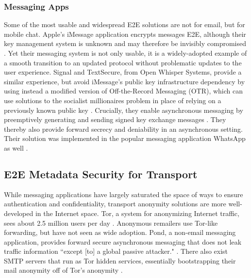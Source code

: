 \documentclass[pageno]{jpaper}
\begin{document}
\subsubsection{Messaging Apps}
Some of the most usable and widespread E2E solutions are not for email, but for mobile chat. Apple's iMessage application encrypts messages E2E, although their key management system is unknown and may therefore be invisibly compromised \cite{imessage}. Yet their messaging system is not only usable, it is a widely-adopted example of a smooth transition to an updated protocol without problematic updates to the user experience. Signal and TextSecure, from Open Whisper Systems, provide a similar experience, but avoid iMessage's public key infrastructure dependency by using instead a modified version of Off-the-Record Messaging (OTR), which can use solutions to the socialist millionaires problem in place of relying on a previously known public key \cite{borisov2004off}. Crucially, they enable asynchronous messaging by preemptively generating and sending signed key exchange messages \cite{whisper}. They thereby also provide forward secrecy and deniability in an asynchronous setting. Their solution was implemented in the popular messaging application WhatsApp as well \cite{whatsapp}.


\subsection{E2E Metadata Security for Transport}
While messaging applications have largely saturated the space of ways to ensure authentication and confidentiality, transport anonymity solutions are more well-developed in the Internet space. Tor, a system for anonymizing Internet traffic, sees about 2.5 million users per day \cite{torusers}. Anonymous remailers use Tor-like forwarding, but have not seen as wide adoption. Pond, a non-email messaging application, provides forward secure asynchronous messaging that does not leak traffic information ``except [to] a global passive attacker." \cite{pond}. There also exist SMTP servers that run as Tor hidden services, essentially bootstrapping their mail anonymity off of Tor's anonymity \cite{onionmail}.
\end{document}
